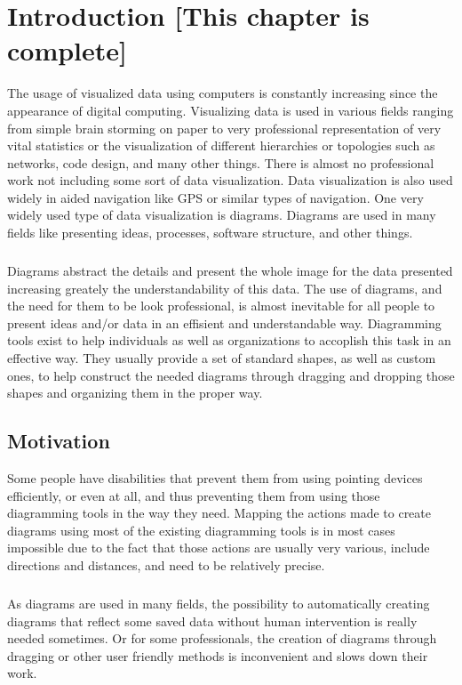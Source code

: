 \chapter{Introduction [This chapter is complete]}
\beginchapter
The usage of visualized data using computers is constantly increasing since the appearance of digital computing. Visualizing data is used in various fields ranging from simple brain storming on paper to very professional representation of very vital statistics or the visualization of different hierarchies or topologies such as networks, code design, and many other things. There is almost no professional work not including some sort of data visualization.
Data visualization is also used widely in aided navigation like GPS or similar types of navigation.
One very widely used type of data visualization is diagrams. Diagrams are used in many fields like presenting ideas, processes, software structure, and other things. 

\paragraph{}
Diagrams abstract the details and present the whole image for the data presented increasing greately the understandability of this data. The use of diagrams, and the need for them to be look professional, is almost inevitable for all people to present ideas and/or data in an effisient and understandable way. Diagramming tools exist to help individuals as well as organizations to accoplish this task in an effective way. They usually provide a set of standard shapes, as well as custom ones, to help construct the needed diagrams through dragging and dropping those shapes and organizing them in the proper way.

\section{Motivation}
Some people have disabilities that prevent them from using pointing devices efficiently, or even at all, and thus preventing them from using those diagramming tools in the way they need. Mapping the actions made to create diagrams using most of the existing diagramming tools is in most cases impossible due to the fact that those actions are usually very various, include directions and distances, and need to be relatively precise.

\paragraph{}
As diagrams are used in many fields, the possibility to automatically creating diagrams that reflect some saved data without human intervention is really needed sometimes. Or for some professionals, the creation of diagrams through dragging or other user friendly methods is inconvenient and slows down their work.

